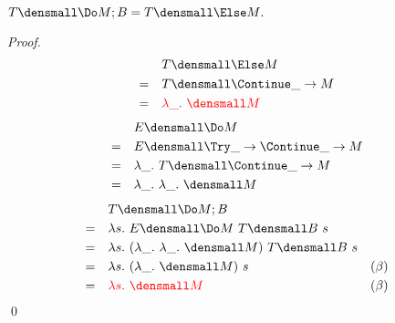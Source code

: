 \begin{theorem}
    $ T\den{\Do M; B} = T\den{\Else M}.$
    \begin{proof}
        \begin{align*}
            &\quad T\den{\Else M} \\
            =&\quad T\den{\Continue \_ \to M} \\
            =&\quad \color{red}{\lambda \_. ~\den{M}} \\
        \end{align*}
        \begin{align*}
            &\quad E\den{\Do M} \\
            =&\quad E\den{\Try \_ \to \Continue \_ \to M} \\
            =& \quad \lambda \_. ~T\den{\Continue \_ \to M} \\
            =& \quad \lambda \_. ~\lambda \_. ~  \den{M}  
        \end{align*}
        \begin{align*}
            &\quad T\den{\Do M; B} \\
            =& \quad \lambda s. ~ E\den{\Do M} ~T\den{B} ~s \\
            =& \quad \lambda s. ~ (\lambda \_. ~\lambda \_. ~  \den{M}) ~T\den{B} ~s \\
            =& \quad \lambda s. ~ (\lambda \_. ~  \den{M}) ~s  & (\beta)\\
            =& \quad \color{red}{\lambda s. ~ \den{M}}  & (\beta)
        \end{align*}
        \qed
    \end{proof}
\end{theorem}

